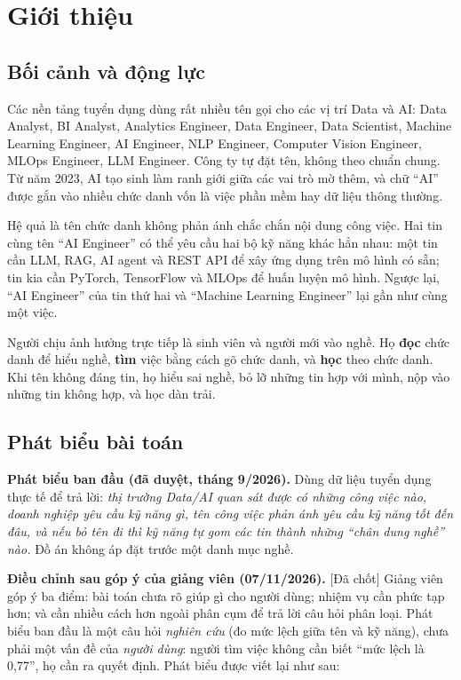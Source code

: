 \documentclass[12pt]{article}
\newcommand{\dachot}{\textsf{[Đã chốt]}}
\begin{document}
\section{Giới thiệu}
\subsection{Bối cảnh và động lực}

Các nền tảng tuyển dụng dùng rất nhiều tên gọi cho các vị trí Data và AI: Data Analyst, BI Analyst, Analytics Engineer, Data Engineer, Data Scientist, Machine Learning Engineer, AI Engineer, NLP Engineer, Computer Vision Engineer, MLOps Engineer, LLM Engineer. Công ty tự đặt tên, không theo chuẩn chung. Từ năm 2023, AI tạo sinh làm ranh giới giữa các vai trò mờ thêm, và chữ ``AI'' được gắn vào nhiều chức danh vốn là việc phần mềm hay dữ liệu thông thường.

Hệ quả là tên chức danh không phản ánh chắc chắn nội dung công việc. Hai tin cùng tên ``AI Engineer'' có thể yêu cầu hai bộ kỹ năng khác hẳn nhau: một tin cần LLM, RAG, AI agent và REST API để xây ứng dụng trên mô hình có sẵn; tin kia cần PyTorch, TensorFlow và MLOps để huấn luyện mô hình. Ngược lại, ``AI Engineer'' của tin thứ hai và ``Machine Learning Engineer'' lại gần như cùng một việc.

Người chịu ảnh hưởng trực tiếp là sinh viên và người mới vào nghề. Họ \textbf{đọc} chức danh để hiểu nghề, \textbf{tìm} việc bằng cách gõ chức danh, và \textbf{học} theo chức danh. Khi tên không đáng tin, họ hiểu sai nghề, bỏ lỡ những tin hợp với mình, nộp vào những tin không hợp, và học dàn trải.

\subsection{Phát biểu bài toán}
\label{sec:problem}

\textbf{Phát biểu ban đầu (đã duyệt, tháng 9/2026).} Dùng dữ liệu tuyển dụng thực tế để trả lời: \textit{thị trường Data/AI quan sát được có những công việc nào, doanh nghiệp yêu cầu kỹ năng gì, tên công việc phản ánh yêu cầu kỹ năng tốt đến đâu, và nếu bỏ tên đi thì kỹ năng tự gom các tin thành những ``chân dung nghề'' nào.} Đồ án không áp đặt trước một danh mục nghề.

\textbf{Điều chỉnh sau góp ý của giảng viên (07/11/2026).} \dachot{} Giảng viên góp ý ba điểm: bài toán chưa rõ giúp gì cho người dùng; nhiệm vụ cần phức tạp hơn; và cần nhiều cách hơn ngoài phân cụm để trả lời câu hỏi phân loại. Phát biểu ban đầu là một câu hỏi \textit{nghiên cứu} (đo mức lệch giữa tên và kỹ năng), chưa phải một vấn đề của \textit{người dùng}: người tìm việc không cần biết ``mức lệch là 0,77'', họ cần ra quyết định. Phát biểu được viết lại như sau:
\end{document}
